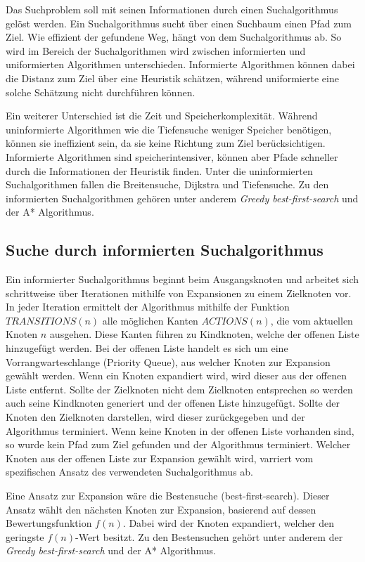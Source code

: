 Das Suchproblem soll mit seinen Informationen durch einen Suchalgorithmus gelöst werden. Ein Suchalgorithmus sucht über einen Suchbaum einen Pfad zum Ziel. Wie effizient der gefundene Weg, hängt von dem Suchalgorithmus ab. So wird im Bereich der Suchalgorithmen wird zwischen informierten und uniformierten Algorithmen unterschieden. Informierte Algorithmen können dabei die Distanz zum Ziel über eine Heuristik schätzen, während uniformierte eine solche Schätzung nicht durchführen können.

Ein weiterer Unterschied ist die Zeit und Speicherkomplexität. Während uninformierte Algorithmen wie die Tiefensuche weniger Speicher benötigen, können sie ineffizient sein, da sie keine Richtung zum Ziel berücksichtigen. Informierte Algorithmen sind speicherintensiver, können aber Pfade schneller durch die Informationen der Heuristik finden.
Unter die uninformierten Suchalgorithmen fallen die Breitensuche, Dijkstra und Tiefensuche. Zu den informierten Suchalgorithmen gehören unter anderem \textit{Greedy best-first-search} und der A* Algorithmus.


\subsection{Suche durch informierten Suchalgorithmus}

Ein informierter Suchalgorithmus beginnt beim Ausgangsknoten und arbeitet sich schrittweise über Iterationen mithilfe von Expansionen zu einem Zielknoten vor. In jeder Iteration ermittelt der Algorithmus mithilfe der Funktion $TRANSITIONS(n)$ alle möglichen Kanten $ACTIONS(n)$, die vom aktuellen Knoten $n$ ausgehen. Diese Kanten führen zu Kindknoten, welche der offenen Liste hinzugefügt werden. Bei der offenen Liste handelt es sich um eine Vorrangwarteschlange (Priority Queue), aus welcher Knoten zur Expansion gewählt werden. Wenn ein Knoten expandiert wird, wird dieser aus der offenen Liste entfernt. Sollte der Zielknoten nicht dem Zielknoten entsprechen so werden auch seine Kindknoten generiert und der offenen Liste hinzugefügt. Sollte der Knoten den Zielknoten darstellen, wird dieser zurückgegeben und der Algorithmus terminiert. Wenn keine Knoten in der offenen Liste vorhanden sind, so wurde kein Pfad zum Ziel gefunden und der Algorithmus terminiert. Welcher Knoten aus der offenen Liste zur Expansion gewählt wird, varriert vom spezifischen Ansatz des verwendeten Suchalgorithmus ab.

Eine Ansatz zur Expansion wäre die Bestensuche (best-first-search). Dieser Ansatz wählt den nächsten Knoten zur Expansion, basierend auf dessen Bewertungsfunktion $f(n)$. Dabei wird der Knoten expandiert, welcher den geringste $f(n)$-Wert besitzt. Zu den Bestensuchen gehört unter anderem der \textit{Greedy best-first-search} und der A* Algorithmus.

